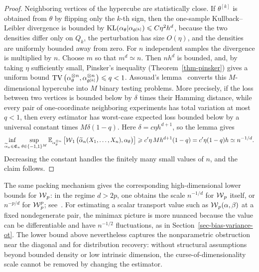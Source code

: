 \begin{proof}
	Neighboring vertices of the hypercube are statistically close. If \(\theta^{[k]}\) is obtained from \(\theta\) by flipping only the \(k\)-th sign, then the one-sample Kullback--Leibler divergence is bounded by
	$\operatorname{KL}(\alpha_\theta|\alpha_{\theta^{[k]}}) \leqslant C\eta^2 h^d$,
	because the two densities differ only on \(Q_k\), the perturbation has size \(O(\eta)\), and the densities are uniformly bounded away from zero. For \(n\) independent samples the divergence is multiplied by \(n\). Choose \(m\) so that \(m^d\simeq n\). Then \(n h^d\) is bounded, and, by taking \(\eta\) sufficiently small, Pinsker's inequality (Theorem~\ref{thm-pinsker}) gives a uniform bound
	$\operatorname{TV}\big(\alpha_\theta^{\otimes n},\alpha_{\theta^{[k]}}^{\otimes n}\big) \leqslant q<1$.
	Assouad's lemma~\cite{assouad1983deux} converts this \(M\)-dimensional hypercube into \(M\) binary testing problems. More precisely, if the loss between two vertices is bounded below by \(\delta\) times their Hamming distance, while every pair of one-coordinate neighboring experiments has total variation at most \(q<1\), then every estimator has worst-case expected loss bounded below by a universal constant times \(M\delta(1-q)\). Here \(\delta=c\eta h^{d+1}\), so the lemma gives
	\[
		\inf_{\widetilde\alpha_n\in\mathfrak E_n}
		\sup_{\theta\in\{-1,1\}^M}
		\mathbb{E}_{\alpha_\theta^{\otimes n}}
		\left[
			\operatorname{\mathcal{W}}_1\big(\widetilde\alpha_n(X_1,\ldots,X_n),\alpha_\theta\big)
		\right]
		\geqslant
		c'\eta\,M h^{d+1}(1-q)
		=
		c'\eta(1-q)h
		\simeq
		n^{-1/d}.
	\]
	Decreasing the constant handles the finitely many small values of \(n\), and the claim follows.
\end{proof}

The same packing mechanism gives the corresponding high-dimensional lower bounds for \(\operatorname{\mathcal{W}}_p\): in the regime \(d>2p\), one obtains the scale \(n^{-1/d}\) for \(\operatorname{\mathcal{W}}_p\) itself, or \(n^{-p/d}\) for \(\operatorname{\mathcal{W}}_p^p\); see~\cite{singh2018minimax,weed2017sharp}. For estimating a scalar transport value such as \(\operatorname{\mathcal{W}}_p(\alpha,\beta)\) at a fixed nondegenerate pair, the minimax picture is more nuanced because the value can be differentiable and have \(n^{-1/2}\) fluctuations, as in Section~\ref{sec-bias-variance-ot}. The lower bound above nevertheless captures the nonparametric obstruction near the diagonal and for distribution recovery: without structural assumptions beyond bounded density or low intrinsic dimension, the curse-of-dimensionality scale cannot be removed by changing the estimator.

